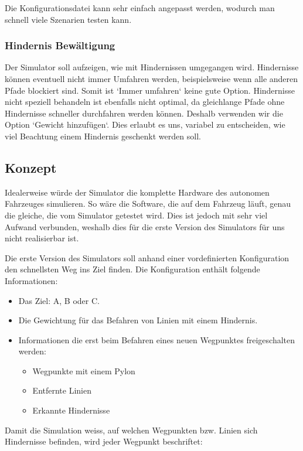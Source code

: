 \documentclass[../main.tex]{subfiles}
\begin{document}
Die Konfigurationsdatei kann sehr einfach angepasst werden, wodurch man schnell viele Szenarien testen kann.

\subsubsection{Hindernis Bewältigung}

Der Simulator soll aufzeigen, wie mit Hindernissen umgegangen wird.
Hindernisse können eventuell nicht immer Umfahren werden, beispielsweise wenn alle anderen Pfade blockiert sind. Somit ist `Immer umfahren` keine gute Option. Hindernisse nicht speziell behandeln ist ebenfalls nicht optimal, da gleichlange Pfade ohne Hindernisse schneller durchfahren werden können. Deshalb verwenden wir die Option `Gewicht hinzufügen`. Dies erlaubt es uns, variabel zu entscheiden, wie viel Beachtung einem Hindernis geschenkt werden soll.

\subsection{Konzept}

Idealerweise würde der Simulator die komplette Hardware des autonomen Fahrzeuges simulieren. So wäre die Software, die auf dem Fahrzeug läuft, genau die gleiche, die vom Simulator getestet wird. Dies ist jedoch mit sehr viel Aufwand verbunden, weshalb dies für die erste Version des Simulators für uns nicht realisierbar ist.

Die erste Version des Simulators soll anhand einer vordefinierten Konfiguration den schnellsten Weg ins Ziel finden. Die Konfiguration enthält folgende Informationen:
\begin{itemize}
    \item Das Ziel: A, B oder C.
    \item Die Gewichtung für das Befahren von Linien mit einem Hindernis.
    \item Informationen die erst beim Befahren eines neuen Wegpunktes freigeschalten werden:
     \begin{itemize}
        \item{Wegpunkte mit einem Pylon}
        \item{Entfernte Linien}
        \item{Erkannte Hindernisse}
   \end{itemize}
\end{itemize}


Damit die Simulation weiss, auf welchen Wegpunkten bzw. Linien sich Hindernisse befinden, wird jeder Wegpunkt beschriftet:
\end{document}

